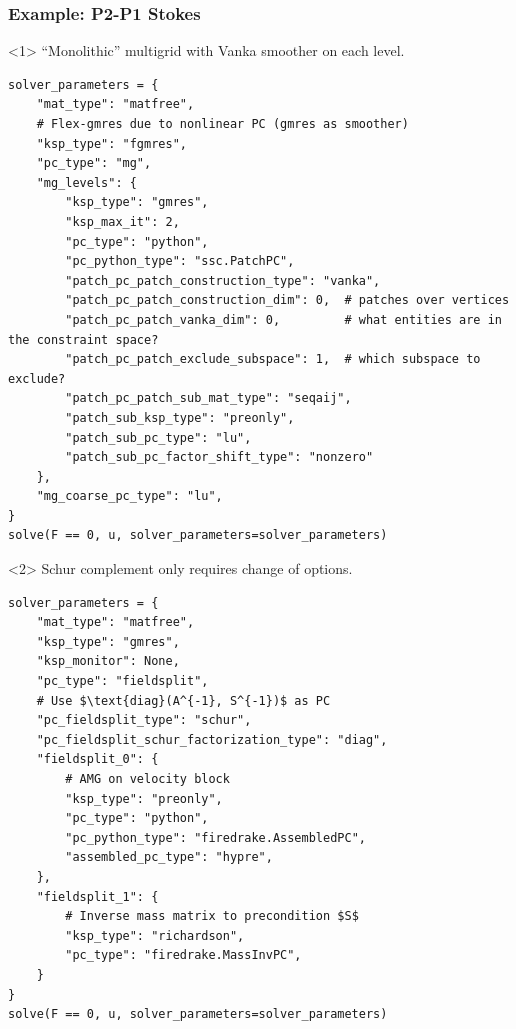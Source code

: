 \documentclass[presentation,aspectratio=43]{beamer}
\begin{document}
\begin{frame}[fragile]
  \frametitle{Example: P2-P1 Stokes}
  \begin{onlyenv}<1>
    ``Monolithic'' multigrid with Vanka smoother on each level.
\begin{verbatim}
solver_parameters = {
    "mat_type": "matfree",
    # Flex-gmres due to nonlinear PC (gmres as smoother)
    "ksp_type": "fgmres",
    "pc_type": "mg",
    "mg_levels": {
        "ksp_type": "gmres",
        "ksp_max_it": 2,
        "pc_type": "python",
        "pc_python_type": "ssc.PatchPC",
        "patch_pc_patch_construction_type": "vanka",
        "patch_pc_patch_construction_dim": 0,  # patches over vertices
        "patch_pc_patch_vanka_dim": 0,         # what entities are in the constraint space?
        "patch_pc_patch_exclude_subspace": 1,  # which subspace to exclude?
        "patch_pc_patch_sub_mat_type": "seqaij",
        "patch_sub_ksp_type": "preonly",
        "patch_sub_pc_type": "lu",
        "patch_sub_pc_factor_shift_type": "nonzero"
    },
    "mg_coarse_pc_type": "lu",
}
solve(F == 0, u, solver_parameters=solver_parameters)
\end{verbatim}
  \end{onlyenv}
  \begin{onlyenv}<2>
    Schur complement only requires change of options.
\begin{verbatim}
solver_parameters = {
    "mat_type": "matfree",
    "ksp_type": "gmres",
    "ksp_monitor": None,
    "pc_type": "fieldsplit",
    # Use $\text{diag}(A^{-1}, S^{-1})$ as PC
    "pc_fieldsplit_type": "schur",
    "pc_fieldsplit_schur_factorization_type": "diag",
    "fieldsplit_0": {
        # AMG on velocity block
        "ksp_type": "preonly",
        "pc_type": "python",
        "pc_python_type": "firedrake.AssembledPC",
        "assembled_pc_type": "hypre",
    },
    "fieldsplit_1": {
        # Inverse mass matrix to precondition $S$
        "ksp_type": "richardson",
        "pc_type": "firedrake.MassInvPC",
    }
}
solve(F == 0, u, solver_parameters=solver_parameters)
\end{verbatim}
  \end{onlyenv}
\end{frame}
\end{document}
